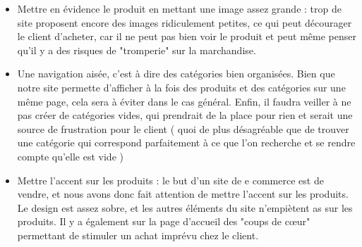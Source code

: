 \begin{itemize}
\item Mettre en évidence le produit en mettant une image assez grande : trop de site proposent encore des images ridiculement petites, ce qui peut décourager le client d'acheter, car il ne peut pas bien voir le produit et peut même penser qu'il y a des risques de "tromperie" sur la marchandise.\\

\item Une navigation aisée, c'est à dire des catégories bien organisées. Bien que notre site permette d'afficher à la fois des produits et des catégories sur une même page, cela sera à éviter dans le cas général. Enfin, il faudra veiller à ne pas créer de catégories vides, qui prendrait de la place pour rien et serait une source de  frustration pour le client ( quoi de plus désagréable que de trouver une catégorie qui correspond parfaitement à ce que l'on recherche et se rendre compte qu'elle est vide )\\

\item Mettre l'accent sur les produits : le but d'un site de e commerce est de vendre, et nous avons donc fait attention de mettre l'accent sur les produits. Le design est assez sobre, et les autres éléments du site 	n'empiètent as sur les produits. Il y a également sur la page d'accueil des "coups de cœur" permettant de stimuler un achat imprévu chez le client.
		\end{itemize}